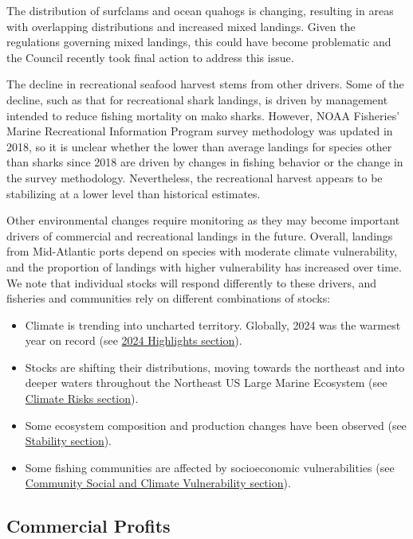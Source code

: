 \documentclass[
  10pt,
]{article}
\providecommand{\tightlist}{%
  \setlength{\itemsep}{0pt}\setlength{\parskip}{0pt}}
\begin{document}
The distribution of surfclams and ocean quahogs is changing, resulting in areas with overlapping distributions and increased mixed landings. Given the regulations governing mixed landings, this could have become problematic and the Council recently took final action to address this issue.

The decline in recreational seafood harvest stems from other drivers. Some of the decline, such as that for recreational shark landings, is driven by management intended to reduce fishing mortality on mako sharks. However, NOAA Fisheries' Marine Recreational Information Program survey methodology was updated in 2018, so it is unclear whether the lower than average landings for species other than sharks since 2018 are driven by changes in fishing behavior or the change in the survey methodology. Nevertheless, the recreational harvest appears to be stabilizing at a lower level than historical estimates.

Other environmental changes require monitoring as they may become important drivers of commercial and recreational landings in the future. Overall, landings from Mid-Atlantic ports depend on species with moderate climate vulnerability, and the proportion of landings with higher vulnerability has increased over time. We note that individual stocks will respond differently to these drivers, and fisheries and communities rely on different combinations of stocks:

\begin{itemize}
\tightlist
\item
  Climate is trending into uncharted territory. Globally, 2024 was the warmest year on record (see \hyperref[highlights]{2024 Highlights section}).
\item
  Stocks are shifting their distributions, moving towards the northeast and into deeper waters throughout the Northeast US Large Marine Ecosystem (see \hyperref[climate-and-ecosystem-change]{Climate Risks section}).
\item
  Some ecosystem composition and production changes have been observed (see \hyperref[stability]{Stability section}).
\item
  Some fishing communities are affected by socioeconomic vulnerabilities (see \hyperref[community-social-and-climate-vulnerability]{Community Social and Climate Vulnerability section}).
\end{itemize}

\subsection{Commercial Profits}\label{commercial-profits}
\end{document}
